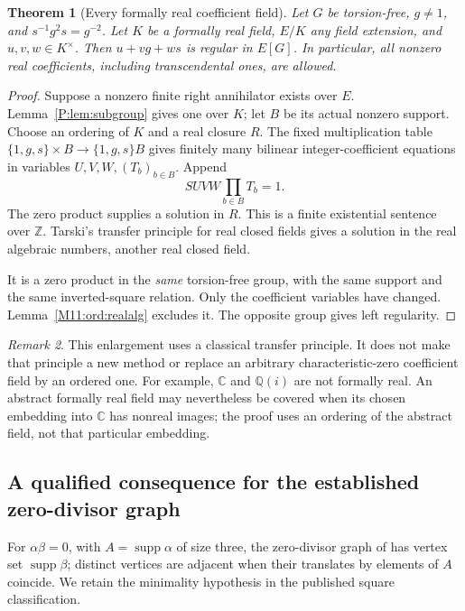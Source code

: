 \documentclass[11pt,a4paper,oneside]{report}
\newtheorem{theorem}{Theorem}[section]
\theoremstyle{definition}
\theoremstyle{remark}
\newtheorem{remark}[theorem]{Remark}
\DeclareMathOperator{\supp}{supp}
\newcommand{\C}{\mathbb C}
\newcommand{\Q}{\mathbb Q}
\newcommand{\Z}{\mathbb Z}
\begin{document}
\begin{theorem}[Every formally real coefficient field]
\label{M11:ord:ordered}
Let $G$ be torsion-free, $g\ne1$, and $s^{-1}g^2s=g^{-2}$.
Let $K$ be a formally real field, $E/K$ any field extension, and
$u,v,w\in K^\times$. Then $u+vg+ws$ is regular in $E[G]$.
In particular, all nonzero real coefficients, including transcendental
ones, are allowed.
\end{theorem}
\begin{proof}
Suppose a nonzero finite right annihilator exists over $E$.
Lemma~\ref{P:lem:subgroup} gives one over $K$; let $B$ be its actual
nonzero support. Choose an ordering of $K$ and a real closure $R$.
The fixed multiplication table $\{1,g,s\}\times B\to\{1,g,s\}B$
gives finitely many bilinear integer-coefficient equations in
variables $U,V,W,(T_b)_{b\in B}$. Append
\[
 S U V W\prod_{b\in B}T_b=1.
\]
The zero product supplies a solution in $R$. This is a finite
existential sentence over $\Z$. Tarski's transfer principle for
real closed fields \cite[Corollary 3.5]{B:Swan} gives a solution
in the real algebraic numbers, another real closed field.

It is a zero product in the \emph{same} torsion-free group, with
the same support and the same inverted-square relation. Only the
coefficient variables have changed. Lemma~\ref{M11:ord:realalg}
excludes it. The opposite group gives left regularity.
\end{proof}

\begin{remark}
This enlargement uses a classical transfer principle. It does not
make that principle a new method or replace an arbitrary
characteristic-zero coefficient field by an ordered one.
For example, $\C$ and $\Q(i)$ are not formally real. An abstract
formally real field may nevertheless be covered when its chosen
embedding into $\C$ has nonreal images; the proof uses an ordering
of the abstract field, not that particular embedding.
\end{remark}

\subsection{A qualified consequence for the established zero-divisor graph}

For $\alpha\beta=0$, with $A=\supp\alpha$ of size three, the
zero-divisor graph of \cite{B:ATsmall} has vertex set $\supp\beta$;
distinct vertices are adjacent when their translates by elements
of $A$ coincide. We retain the minimality hypothesis in the
published square classification.
\end{document}
